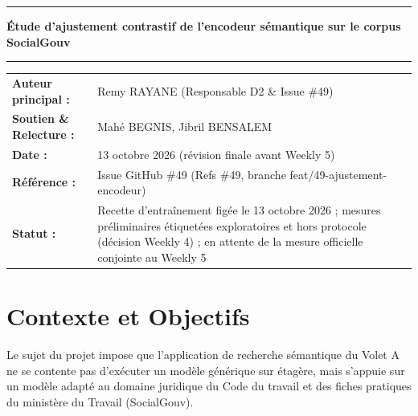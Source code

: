 \documentclass[11pt,a4paper]{article}
\newcommand{\code}[1]  {{\ttfamily #1}}
\newlength{\metalab}
\newlength{\tw}\setlength{\tw}{\textwidth}
\begin{document}
\thispagestyle{empty}
\begingroup\sffamily
{\color{accent}\rule{\textwidth}{2.6pt}}\par\vspace{13pt}
{\fontsize{27}{31}\selectfont\bfseries\color{encre} Étude d'ajustement contrastif de l'encodeur sémantique sur le corpus SocialGouv}\par\vspace{7pt}
{\color{filet}\rule{\textwidth}{0.6pt}}\par\vspace{14pt}
\endgroup
\begingroup\setlength{\parskip}{0pt}
\settowidth{\metalab}{\tabfont\bfseries Soutien \& Relecture :}
\begin{tabular}{@{}>{\tabfont\bfseries\color{accent}}l@{\hspace{16pt}}p{\dimexpr\textwidth-\metalab-18pt\relax}@{}}
Auteur principal : & Remy RAYANE (Responsable D2 \& Issue \#49) \\[3.5pt]
Soutien \& Relecture : & Mahé BEGNIS, Jibril BENSALEM \\[3.5pt]
Date : & 13 octobre 2026 (révision finale avant Weekly 5) \\[3.5pt]
Référence : & Issue GitHub \#49 (\code{Refs \#49}, branche \code{feat/\allowbreak{}49-\allowbreak{}ajustement-\allowbreak{}encodeur}) \\[3.5pt]
Statut : & Recette d'entraînement figée le 13 octobre 2026 ; mesures préliminaires étiquetées exploratoires et hors protocole (décision Weekly 4) ; en attente de la mesure officielle conjointe au Weekly 5 \\[3.5pt]
\end{tabular}\par\vspace{16pt}\endgroup
\vspace{10pt}{\color{filet}\rule{\textwidth}{0.4pt}}\par\vspace{16pt}
\begingroup\setlength{\parskip}{0pt}\tableofcontents\endgroup
\clearpage

\section{Contexte et Objectifs}

Le sujet du projet impose que l'application de recherche sémantique du Volet A ne se contente pas d'exécuter un modèle générique sur étagère, mais s'appuie sur un modèle adapté au domaine juridique du Code du travail et des fiches pratiques du ministère du Travail (SocialGouv).
\end{document}
